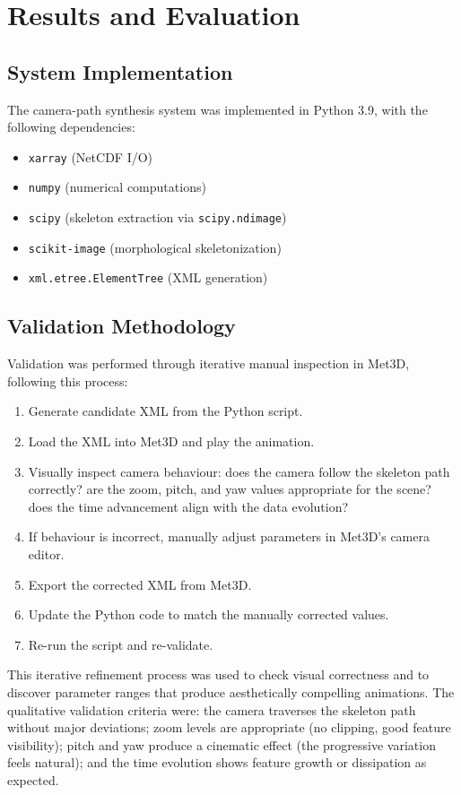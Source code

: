 \documentclass[journal abbreviation, manuscript]{copernicus}
\begin{document}
\section{Results and Evaluation}

\subsection{System Implementation}
The camera-path synthesis system was implemented in Python 3.9, with the following dependencies:
\begin{itemize}
\item \texttt{xarray} (NetCDF I/O)
\item \texttt{numpy} (numerical computations)
\item \texttt{scipy} (skeleton extraction via \texttt{scipy.ndimage})
\item \texttt{scikit-image} (morphological skeletonization)
\item \texttt{xml.etree.ElementTree} (XML generation)
\end{itemize}

\subsection{Validation Methodology}
Validation was performed through iterative manual inspection in Met3D, following this process:
\begin{enumerate}
\item Generate candidate XML from the Python script.
\item Load the XML into Met3D and play the animation.
\item Visually inspect camera behaviour: does the camera follow the skeleton path correctly? are the zoom, pitch, and yaw values appropriate for the scene? does the time advancement align with the data evolution?
\item If behaviour is incorrect, manually adjust parameters in Met3D's camera editor.
\item Export the corrected XML from Met3D.
\item Update the Python code to match the manually corrected values.
\item Re-run the script and re-validate.
\end{enumerate}
This iterative refinement process was used to check visual correctness and to discover parameter ranges that produce aesthetically compelling animations. The qualitative validation criteria were: the camera traverses the skeleton path without major deviations; zoom levels are appropriate (no clipping, good feature visibility); pitch and yaw produce a cinematic effect (the progressive variation feels natural); and the time evolution shows feature growth or dissipation as expected.
\end{document}
